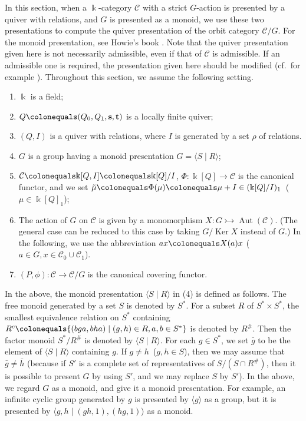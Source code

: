 \documentclass{surv-l}
\numberwithin{equation}{chapter}
\numberwithin{figure}{chapter}
\theoremstyle{plain}
\theoremstyle{definition}
\theoremstyle{remark}
\DeclareMathOperator{\Ker}{Ker}
\DeclareMathOperator{\Aut}{Aut}
\begin{document}
In this section, when a $\Bbbk$-category ${\mathcal{C}}$ with a strict $G$-action
is presented by a quiver with relations, and $G$ is presented as a monoid,
we use these two presentations to compute
the quiver presentation of the orbit category ${\mathcal{C}}/G$.
For the monoid presentation, see Howie's book \cite{Ho95}.
Note that the quiver presentation given here is not necessarily admissible,
even if that of ${\mathcal{C}}$ is admissible.
If an admissible one is required, the presentation given here should be modified
(cf.\ for example \cite{RR}).
Throughout this section, we assume the following setting.
\begin{enumerate}
\item
$\Bbbk$ is a field;

\item
$Q\colonequals (Q_{0},Q_{1},\mathbf{s},\mathbf{t})$ is a locally finite quiver;

\item
$(Q, I)$ is a quiver with relations, where $I$ is generated by a set $\rho$ of relations.

\item
$G$ is a group having a monoid presentation $G={\langle S\mid R \rangle}$;

\item
${\mathcal{C}}\colonequals \Bbbk[Q, I]\colonequals  \Bbbk[Q]/I$,
$\Phi\colon \Bbbk[Q] \to {\mathcal{C}}$ is the canonical functor, and
we set $\tilde{\mu}\colonequals  \Phi(\mu)\colonequals  \mu + I \in (\Bbbk[Q]/I)_1$\ ($\mu \in \Bbbk[Q]_1$);

\item
The action of $G$ on ${\mathcal{C}}$ is given by a monomorphism
$X\colon G \rightarrowtail \Aut({\mathcal{C}})$.
(The general case can be reduced to this case by taking $G/\Ker X$ instead of $G$.)
In the following, we use the abbreviation $ax\colonequals  X(a)x$ ($a \in G, x \in {\mathcal{C}}_0 \cup {\mathcal{C}}_1$).

\item
$(P, \phi)\colon {\mathcal{C}} \to {\mathcal{C}}/G$ is the canonical covering functor.
\end{enumerate}

In the above, the monoid presentation ${\langle S \mid R \rangle}$ in (4) is defined as follows.
The free monoid generated by a set $S$ is denoted by $S^*$.
For a subset $R$ of $S^* \times S^*$, the smallest equivalence relation on $S^*$
containing $R^c\colonequals  \{(bga, bha) \mid (g,h) \in R, a, b \in S^*\}$ is denoted by $R^\#$.
Then the factor monoid $S^*/R^\#$ is denoted by ${\langle S \mid R \rangle}$.
For each $g \in S^*$, we set $\bar{g}$ to be the element of ${\langle S \mid R \rangle}$
containing $g$.
If $g \ne h$\ ($g, h \in S$), then we may assume that
$\bar{g} \ne \bar{h}$ (because if $S'$ is a complete set of representatives of $S/(S \cap R^\#)$,
then it is possible to present $G$ by using $S'$, and we may replace $S$ by $S'$).
In the above, we regard $G$ as a monoid, and give it a monoid presentation.
For example, an infinite cyclic group generated by $g$ is presented by
${\langle g \rangle}$ as a group, but it is presented by
${\langle g, h \mid (gh, 1), (hg, 1) \rangle}$ as a monoid.
\end{document}

